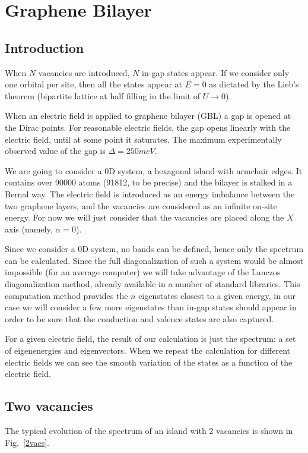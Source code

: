 \chapter{Graphene Bilayer}
\section{Introduction}
When $N$ vacancies are introduced, $N$ in-gap states appear. If we consider only one orbital per site, then all the states appear at $E=0$ as dictated by the Lieb's theorem (bipartite lattice at half filling in the limit of $U\to 0$).

When an electric field is applied to graphene bilayer (GBL) a gap is opened at the Dirac points. For reasonable electric fields, the gap opens linearly with the electric field, until at some point it saturates. The maximum experimentally observed value of the gap is\cite{Zhang2009} $\Delta=250meV$.

We are going to consider a 0D system, a hexagonal island with armchair edges. It contains over 90000 atoms (91812, to be precise) and the bilayer is stalked in a Bernal way.
The electric field is introduced as an energy imbalance between the two graphene layers, and the vacancies are considered as an infinite on-site energy. For now we will just consider that the vacancies are placed along the $X$ axis (namely, $\alpha=0$).

Since we consider a 0D system, no bands can be defined, hence only the spectrum can be calculated. Since the full diagonalization of such a system would be almost impossible (for an average computer) we will take advantage of the Lanczos diagonalization method\cite{Arnoldi1951,Lanczos1950}, already available in a number of standard libraries.
This computation method provides the $n$ eigenstates closest to a given energy, in our case we will consider a few more eigenstates than in-gap states should appear in order to be sure that the conduction and valence states are also captured.

For a given electric field, the result of our calculation is just the spectrum: a set of eigenenergies and eigenvectors. When we repeat the calculation for different electric fields we can see the smooth variation of the states as a function of the electric field.

\section{Two vacancies}
The typical evolution of the spectrum of an island with 2 vacancies is shown in Fig.~\ref{2vacs}.
